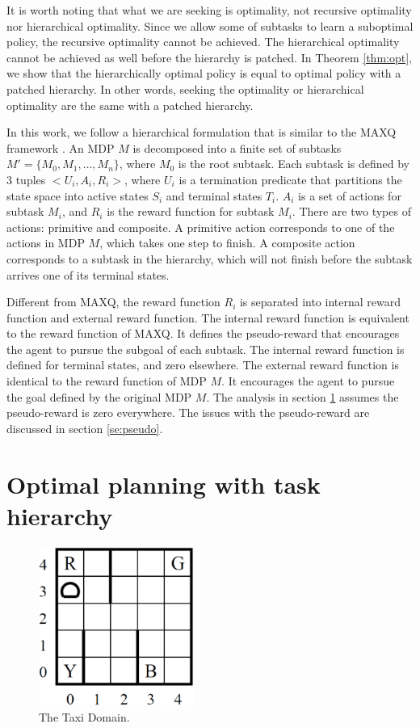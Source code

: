 It is worth noting that what we are seeking is optimality, not recursive
optimality nor hierarchical optimality. Since we allow some of subtasks to
learn a suboptimal policy, the recursive optimality cannot be achieved. The
hierarchical optimality cannot be achieved as well before the hierarchy is
patched. In Theorem \ref{thm:opt}, we show that the hierarchically optimal
policy is equal to optimal policy with a patched hierarchy. In other words,
seeking the optimality or hierarchical optimality are the same with a patched
hierarchy. 

In this work, we follow a hierarchical formulation that is similar to the MAXQ framework \cite{MaxQJ}.
An MDP $M$ is decomposed into a finite
set of subtasks $M' = \{M_0, M_1, \dots, M_n\}$, where $M_0$ is the root subtask. 
Each subtask is defined by 3 tuples $<U_i, A_i, R_i>$, where 
$U_i$ is a termination predicate that partitions the state space into active states $S_i$ and terminal states $T_i$.
$A_i$ is a set of actions for subtask $M_i$,
and $R_i$ is the reward function for subtask $M_i$. There are two types of
actions: primitive and composite. A primitive action corresponds to one of the
actions in MDP $M$, which takes one step to finish. A composite action
corresponds to a subtask in the hierarchy, which will not finish before the
subtask arrives one of its terminal states.

Different from MAXQ, 
the reward function $R_i$ is separated into internal reward function and external reward function.
The internal reward function is equivalent to the reward function of MAXQ. It defines the pseudo-reward that
encourages the agent to pursue the subgoal of each subtask.
The internal reward function is defined for terminal states, and zero elsewhere.
The external reward function is identical to the reward function of MDP $M$.
It encourages the agent to pursue the goal defined by the original MDP $M$.
The analysis in section \ref{se:OptimalPlanning} assumes the pseudo-reward is zero everywhere.
The issues with the pseudo-reward are discussed in section \ref{se:pseudo}.

\section{Optimal planning with task hierarchy}
\label{se:OptimalPlanning}

\begin{figure}[ht]
\begin{center}
    \includegraphics[width=2in] {./figures/taxi.eps}
\end{center}
\caption{The Taxi Domain.}
\label{fig:taxi_domain}
\end{figure}


